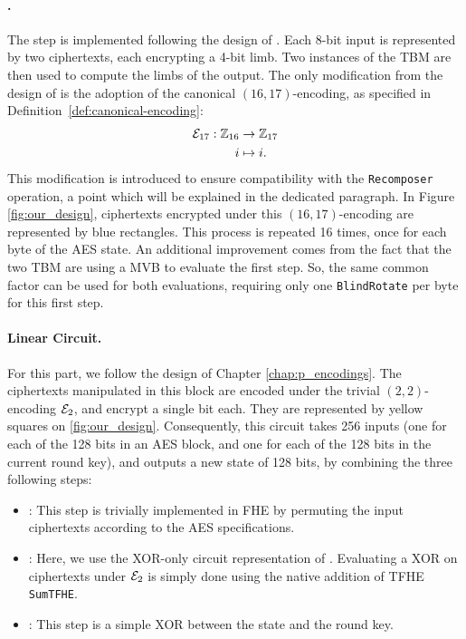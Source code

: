 \paragraph{\SubBytes.} The \SubBytes step is implemented following the design of \cite{DBLP:conf/wahc/TramaCBS23}. Each 8-bit input is represented by two ciphertexts, each encrypting a 4-bit limb. Two instances of the TBM are then used to compute the limbs of the output. The only modification from the design of \cite{DBLP:conf/wahc/TramaCBS23} is the adoption of the canonical $(16, 17)$-encoding, as specified in Definition~\ref{def:canonical-encoding}:
\begin{align*}
    \mathcal{E}_{17}: \mathbb{Z}_{16} &\rightarrow \mathbb{Z}_{17}\\
     i &\mapsto i.
\end{align*}
This modification is introduced to ensure compatibility with the \texttt{Recomposer} operation, a point which will be explained in the dedicated paragraph. In Figure \ref{fig:our_design}, ciphertexts encrypted under this $(16, 17)$-encoding are represented by blue rectangles. This process is repeated 16 times, once for each byte of the AES state.
An additional improvement comes from the fact that the two TBM are using a MVB to evaluate the first step. So, the same common factor can be used for both evaluations, requiring only one \texttt{BlindRotate} per byte for this first step. 


\paragraph{Linear Circuit.} For this part, we follow the design of Chapter \ref{chap:p_encodings}. The ciphertexts manipulated in this block are encoded under the trivial $(2, 2)$-encoding $\mathcal{E}_2$, and encrypt a single bit each. They are represented by yellow squares on \ref{fig:our_design}. Consequently, this circuit takes 256 inputs (one for each of the 128 bits in an AES block, and one for each of the 128 bits in the current round key), and outputs a new state of 128 bits, by combining the three following steps:
\begin{itemize}
    \item \ShiftRows: This step is trivially implemented in FHE by permuting the input ciphertexts according to the AES specifications.
    \item \MixColumns: Here, we use the XOR-only circuit representation of \cite{EPRINT:Maximov19}. Evaluating a XOR on ciphertexts under $\mathcal{E}_2$ is simply done using the native addition of TFHE \texttt{SumTFHE}.
    \item \AddRoundKey: This step is a simple XOR between the state and the round key.
\end{itemize}

